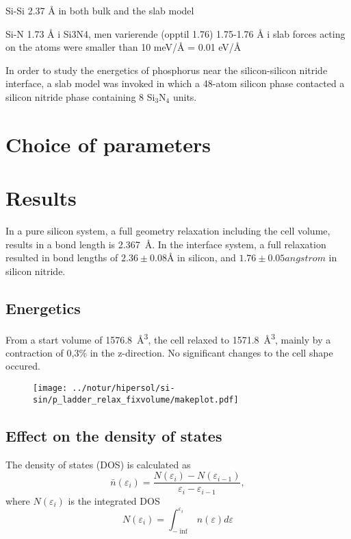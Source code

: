\documentclass[11pt,bibliography=totoc,index=totoc]{scrbook}   %
\begin{document}
Si-Si 2.37 Å in both bulk and the slab model

Si-N 1.73 Å i Si3N4, men varierende (opptil 1.76)
1.75-1.76 Å i slab
forces acting on the atoms were smaller than 10 meV/Å = 0.01 eV/Å


In order to study the energetics of phosphorus near the silicon-silicon nitride interface,
a slab model was invoked in which a 48-atom silicon phase contacted a silicon nitride phase containing 
8 Si$_3$N$_4$ units.

\section{Choice of parameters}



\section{Results}

In a pure silicon system, a full geometry relaxation including the cell volume, results in a bond length is \SI{2.367}{\angstrom}. %
In the interface system, a full relaxation resulted in bond lengths of $2.36\pm0.08\si{\angstrom}$ in silicon, and $1.76\pm 0.05\si{angstrom}$ in silicon nitride.


\subsection{Energetics}

From a start volume of \SI{1576.8}{\angstrom\cubed}, the cell relaxed to \SI{1571.8}{\angstrom\cubed}, mainly by a contraction of 0,3\% in the z-direction. No significant changes to the cell shape occured.

\begin{figure}[htp]
  \centering
  \texttt{[image: ../notur/hipersol/si-sin/p\_ladder\_relax\_fixvolume/makeplot.pdf]}
  \caption{}
  \label{fig:nome}
\end{figure}


\subsection{Effect on the density of states}

The density of states (DOS) is calculated as
\begin{equation}
    \bar{n}(\varepsilon_i) = \frac{N(\varepsilon_i) - N(\varepsilon_{i-1})}{\varepsilon_i - \varepsilon_{i-1}},
\end{equation}
where $N(\varepsilon_i)$ is the integrated DOS
\begin{equation}
    N(\varepsilon_i) = \int_{-\inf}^{\varepsilon_i} n(\varepsilon) d\varepsilon
\end{equation}
\end{document}
